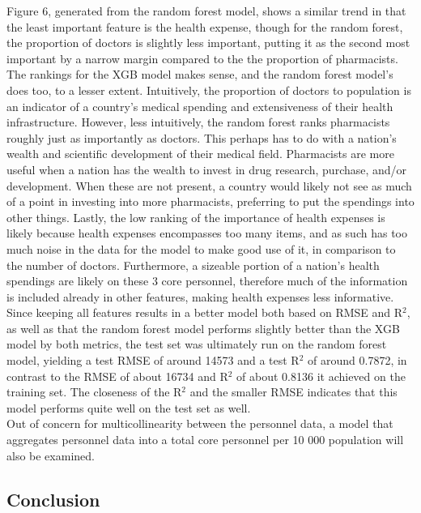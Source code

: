 \documentclass[
  letterpaper,
  DIV=11,
  numbers=noendperiod]{scrartcl}
\begin{document}
Figure 6, generated from the random
forest model, shows a similar trend in that the least important feature
is the health expense, though for the random forest, the proportion of
doctors is slightly less important, putting it as the second most
important by a narrow margin compared to the the proportion of
pharmacists. \\
The rankings for the XGB model makes sense, and the random
forest model's does too, to a lesser extent. Intuitively, the proportion
of doctors to population is an indicator of a country's medical spending
and extensiveness of their health infrastructure. However, less
intuitively, the random forest ranks pharmacists roughly just as
importantly as doctors. This perhaps has to do with a nation's wealth
and scientific development of their medical field. Pharmacists are more
useful when a nation has the wealth to invest in drug research,
purchase, and/or development. When these are not present, a country
would likely not see as much of a point in investing into more
pharmacists, preferring to put the spendings into other things. Lastly,
the low ranking of the importance of health expenses is likely because
health expenses encompasses too many items, and as such has too much
noise in the data for the model to make good use of it, in comparison to
the number of doctors. Furthermore, a sizeable portion of a nation's
health spendings are likely on these 3 core personnel, therefore much of the
information is included already in other features, making health
expenses less informative. \\
Since keeping all features results in a better
model both based on RMSE and R\(^2\), as well as that the random forest
model performs slightly better than the XGB model by both metrics, the
test set was ultimately run on the random forest model, yielding a test
RMSE of around 14573 and a test R\(^2\) of around 0.7872, in contrast to
the RMSE of about 16734 and R\(^2\) of about 0.8136 it achieved on the
training set. The closeness of the R\(^2\) and the smaller RMSE
indicates that this model performs quite well on the test set as well.\\
Out of concern for multicollinearity between the personnel data, a model that aggregates personnel data into a total core personnel per 10 000 population will also be examined.

\subsection{Conclusion}\label{conclusion}
\end{document}
